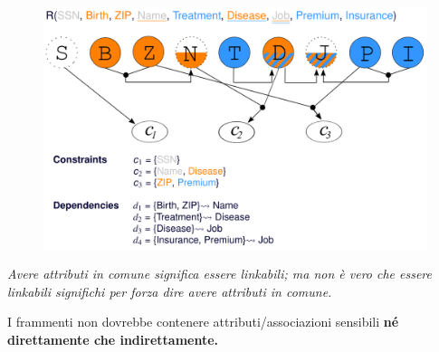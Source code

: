 \documentclass{report}
\begin{document}
\begin{figure}[ht]
    \centering
    \includegraphics[width=1\linewidth]{images/fragmentation/inference2.png}
\end{figure}

\textit{Avere attributi in comune significa essere linkabili; ma non è vero 
che essere linkabili significhi per forza dire avere attributi in comune.}

\noindent I frammenti non dovrebbe contenere attributi/associazioni sensibili 
\textbf{né direttamente che indirettamente.}
\end{document}
